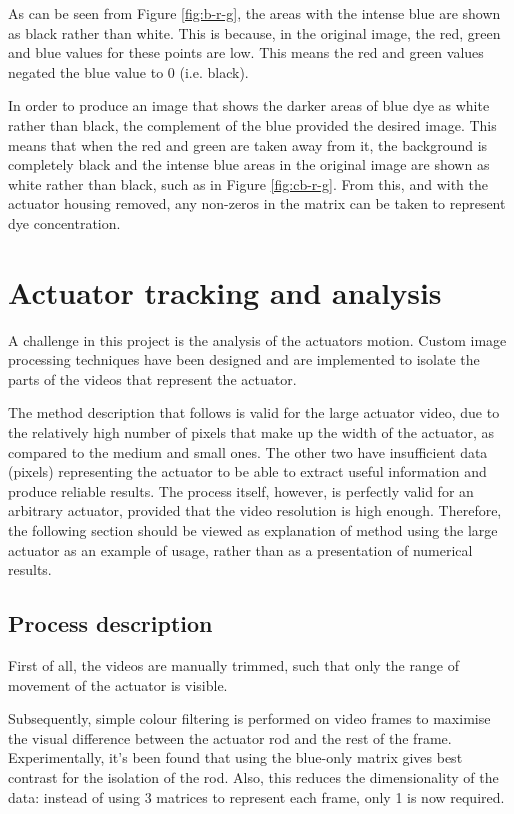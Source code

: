 As can be seen from Figure \ref{fig:b-r-g}, the areas with the intense blue are shown as black rather than white. This is because, in the original image, the red, green and blue values for these points are low. This means the red and green values negated the blue value to 0 (i.e. black).

In order to produce an image that shows the darker areas of blue dye as white rather than black, the complement of the blue provided the desired image. This means that when the red and green are taken away from it, the background is completely black and the intense blue areas in the original image are shown as white rather than black, such as in Figure \ref{fig:cb-r-g}. From this, and with the actuator housing removed, any non-zeros in the matrix can be taken to represent dye concentration.



\section{Actuator tracking and analysis}
\label{sec:actuatortracking}
A challenge in this project is the analysis of the actuators motion. Custom image processing techniques have been designed and are implemented to isolate the parts of the videos that represent the actuator.

The method description that follows is valid for the large actuator video, due to the relatively high number of pixels that make up the width of the actuator, as compared to the medium and small ones. The other two have insufficient data (pixels) representing the actuator to be able to extract useful information and produce reliable results. The process itself, however, is perfectly valid for an arbitrary actuator, provided that the video resolution is high enough. Therefore, the following section should be viewed as explanation of method using the large actuator as an example of usage, rather than as a presentation of numerical results.

\subsection{Process description}
First of all, the videos are manually trimmed, such that only the range of movement of the actuator is visible.

Subsequently, simple colour filtering is performed on video frames to maximise the visual difference between the actuator rod and the rest of the frame. Experimentally, it's been found that using the blue-only matrix gives best contrast for the isolation of the rod. Also, this reduces the dimensionality of the data: instead of using 3 matrices to represent each frame, only 1 is now required.

